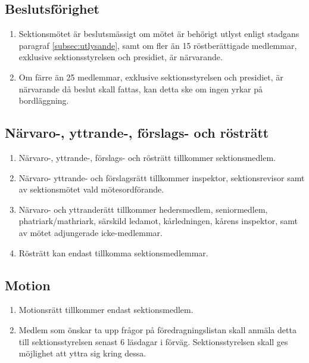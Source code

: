 \documentclass[11pt,a4paper]{article}
\begin{document}
\subsection{Beslutsförighet}

\begin{enumerate}[\thesubsection .1]

  \item Sektionsmötet är beslutsmässigt om mötet är behörigt utlyst
  enligt stadgans paragraf \ref{subsec:utlysande}, samt om fler än 15 röstberättigade medlemmar, exklusive sektionsstyrelsen och presidiet, är närvarande.

  \item Om färre än 25 medlemmar, exklusive sektionsstyrelsen och presidiet, är närvarande då beslut skall fattas, kan detta ske om ingen yrkar på bordläggning.
  

\end{enumerate}

\subsection{Närvaro-, yttrande-, förslags- och rösträtt}

\begin{enumerate}[\thesubsection .1]

  \item Närvaro-, yttrande-, förslags- och rösträtt tillkommer sektionsmedlem.
  
  \item Närvaro- yttrande- och förslagsrätt tillkommer inspektor, sektionsrevisor samt av sektionsmötet vald mötesordförande.
  
  \item Närvaro- och yttranderätt tillkommer
  heders\-med\-lem, seniormedlem, phatriark/mathriark, särskild ledamot, kårledningen, kårens inspektor, samt av mötet adjungerade icke-medlemmar.



  \item Rösträtt kan endast tillkomma sektionsmedlemmar.

\end{enumerate}

\subsection{Motion}

\begin{enumerate}[\thesubsection .1]

  \item Motionsrätt tillkommer endast sektionsmedlem.

  \item Medlem som önskar ta upp frågor på föredragningslistan skall
  anmäla detta till sektionsstyrelsen senast 6 läsdagar i förväg. Sektionsstyrelsen skall ges möjlighet att yttra sig kring dessa.
    
\end{enumerate}
\end{document}
